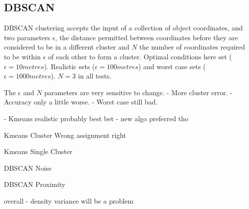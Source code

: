 \subsection{DBSCAN}
DBSCAN clustering accepts the input of a collection of object coordinates, and two parameters $\epsilon$, the distance permitted between coordinates before they are considered to be in a different cluster and $N$ the number of coordinates required to be within $\epsilon$ of each other to form a cluster. 
Optimal conditions here set ($\epsilon = 10 metres$). Realistic sets ($\epsilon = 100 metres$) and worst case sets ($\epsilon = 1000 metres$). $N=3$ in all tests. 


The $\epsilon$ and $N$ parameters are very sensitive to change. 
- More cluster error.
- Accuracy only a little worse.
- Worst case still bad. 

- Kmeans realistic probably best bet
- new algo preferred tho

Kmeans Cluster Wrong assignment right 

Kmeans Single Cluster

DBSCAN Noise

DBSCAN Proximity 

overall - density variance will be a problem 

